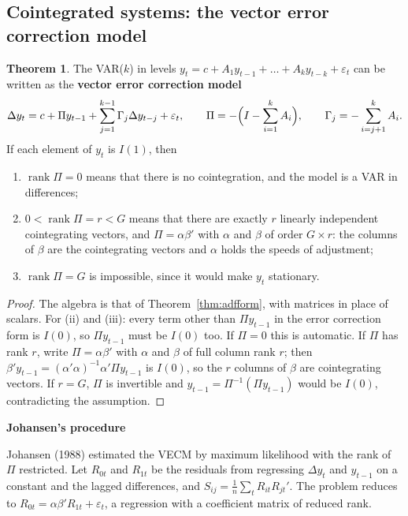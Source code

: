 \documentclass[11pt,a4paper]{article}
\numberwithin{equation}{section}
\DeclareMathOperator{\rank}{rank}
\theoremstyle{definition}
\newtheorem{thm}{Theorem}[subsection]
\newcommand{\subhead}[1]{%
  \par\medskip\noindent\textbf{#1}\par\nobreak\smallskip}
\begin{document}
\subsection{Cointegrated systems: the vector error correction model}
\label{ssec:vecm}

\begin{thm}
\label{thm:vecm}
The VAR($k$) in levels $y_t = c + A_1y_{t-1} + \dots + A_ky_{t-k} + \varepsilon_t$ can be written as the \textbf{vector error correction model}
\[
\Delta y_t = c + \Pi y_{t-1} + \sum_{j=1}^{k-1}\Gamma_j\Delta y_{t-j} + \varepsilon_t, \qquad \Pi = -\Bigl(I - \sum_{i=1}^kA_i\Bigr), \qquad \Gamma_j = -\sum_{i=j+1}^kA_i .
\]
If each element of $y_t$ is $I(1)$, then
\begin{enumerate}[label=(\roman*)]
\item $\rank\Pi = 0$ means that there is no cointegration, and the model is a VAR in differences;
\item $0 < \rank\Pi = r < G$ means that there are exactly $r$ linearly independent cointegrating vectors, and $\Pi = \alpha\beta'$ with $\alpha$ and $\beta$ of order $G \times r$: the columns
of $\beta$ are the cointegrating vectors and $\alpha$ holds the speeds of adjustment;
\item $\rank\Pi = G$ is impossible, since it would make $y_t$ stationary.
\end{enumerate}
\end{thm}

\begin{proof}
The algebra is that of Theorem~\ref{thm:adfform}, with matrices in place of scalars. For (ii) and (iii): every term other than $\Pi y_{t-1}$ in the error
correction form is $I(0)$, so $\Pi y_{t-1}$ must be $I(0)$ too. If $\Pi = 0$ this is automatic. If $\Pi$ has rank $r$, write $\Pi = \alpha\beta'$ with $\alpha$ and $\beta$ of full column rank $r$; then
$\beta'y_{t-1} = (\alpha'\alpha)^{-1}\alpha'\Pi y_{t-1}$ is $I(0)$, so the $r$ columns of $\beta$ are cointegrating vectors. If $r = G$, $\Pi$ is invertible and $y_{t-1} = \Pi^{-1}(\Pi y_{t-1})$ would be
$I(0)$, contradicting the assumption.
\end{proof}

\subhead{Johansen's procedure}
Johansen (1988) estimated the VECM by maximum likelihood with the rank of $\Pi$ restricted. Let $R_{0t}$ and $R_{1t}$ be the residuals from regressing $\Delta y_t$ and
$y_{t-1}$ on a constant and the lagged differences, and $S_{ij} = \frac1n\sum_tR_{it}R_{jt}'$. The problem reduces to $R_{0t} = \alpha\beta'R_{1t} + \varepsilon_t$, a regression with a coefficient matrix of
reduced rank.
\end{document}
